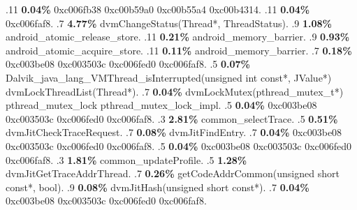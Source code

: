 \begin{profile}
{.11 \textbf{0.04\%} 0xc006fb38\newline {} 0xc00b59a0\newline {} 0xc00b55a4\newline {} 0xc00b4314. 
.11 \textbf{0.04\%} 0xc006faf8. 
.7 \textbf{4.77\%} dvmChangeStatus(Thread*, ThreadStatus). 
.9 \textbf{1.08\%} android\_atomic\_release\_store. 
.11 \textbf{0.21\%} android\_memory\_barrier. 
.9 \textbf{0.93\%} android\_atomic\_acquire\_store. 
.11 \textbf{0.11\%} android\_memory\_barrier. 
.7 \textbf{0.18\%} 0xc003be08\newline {} 0xc003503c\newline {} 0xc006fed0\newline {} 0xc006faf8. 
.5 \textbf{0.07\%} Dalvik\_java\_lang\_VMThread\_isInterrupted(unsigned int const*, JValue*)\newline {} dvmLockThreadList(Thread*). 
.7 \textbf{0.04\%} dvmLockMutex(pthread\_mutex\_t*)\newline {} pthread\_mutex\_lock\newline {} pthread\_mutex\_lock\_impl. 
.5 \textbf{0.04\%} 0xc003be08\newline {} 0xc003503c\newline {} 0xc006fed0\newline {} 0xc006faf8. 
.3 \textbf{2.81\%} common\_selectTrace. 
.5 \textbf{0.51\%} dvmJitCheckTraceRequest. 
.7 \textbf{0.08\%} dvmJitFindEntry. 
.7 \textbf{0.04\%} 0xc003be08\newline {} 0xc003503c\newline {} 0xc006fed0\newline {} 0xc006faf8. 
.5 \textbf{0.04\%} 0xc003be08\newline {} 0xc003503c\newline {} 0xc006fed0\newline {} 0xc006faf8. 
.3 \textbf{1.81\%} common\_updateProfile. 
.5 \textbf{1.28\%} dvmJitGetTraceAddrThread. 
.7 \textbf{0.26\%} getCodeAddrCommon(unsigned short const*, bool). 
.9 \textbf{0.08\%} dvmJitHash(unsigned short const*). 
.7 \textbf{0.04\%} 0xc003be08\newline {} 0xc003503c\newline {} 0xc006fed0\newline {} 0xc006faf8. 
}
\end{profile}

